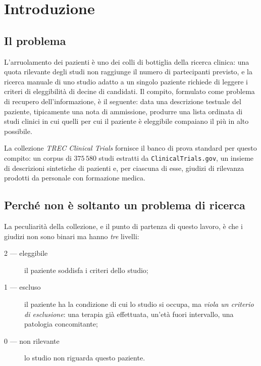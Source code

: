 \documentclass[pdflatex,sn-mathphys-num]{sn-jnl}
\theoremstyle{thmstyleone}
\theoremstyle{thmstyletwo}
\theoremstyle{thmstylethree}
\begin{document}
\section{Introduzione}\label{sec:intro}

\subsection{Il problema}\label{sec:problema}

L'arruolamento dei pazienti è uno dei colli di bottiglia della ricerca clinica: una quota rilevante degli studi non raggiunge il numero di partecipanti previsto, e la ricerca manuale di uno studio adatto a un singolo paziente richiede di leggere i criteri di eleggibilità di decine di candidati. Il compito, formulato come problema di recupero dell'informazione, è il seguente: data una descrizione testuale del paziente, tipicamente una nota di ammissione, produrre una lista ordinata di studi clinici in cui quelli per cui il paziente è eleggibile compaiano il più in alto possibile.

La collezione \emph{TREC Clinical Trials} \cite{trecct2021,trecct2022} fornisce il banco di prova standard per questo compito: un corpus di $375\,580$ studi estratti da \texttt{ClinicalTrials.gov}, un insieme di descrizioni sintetiche di pazienti e, per ciascuna di esse, giudizi di rilevanza prodotti da personale con formazione medica.

\subsection{Perché non è soltanto un problema di ricerca}\label{sec:tesi}

La peculiarità della collezione, e il punto di partenza di questo lavoro, è che i giudizi non sono binari ma hanno \emph{tre} livelli:

\begin{description}
  \item[2 --- eleggibile] il paziente soddisfa i criteri dello studio;
  \item[1 --- escluso] il paziente ha la condizione di cui lo studio si occupa, ma \emph{viola un criterio di esclusione}: una terapia già effettuata, un'età fuori intervallo, una patologia concomitante;
  \item[0 --- non rilevante] lo studio non riguarda questo paziente.
\end{description}
\end{document}
